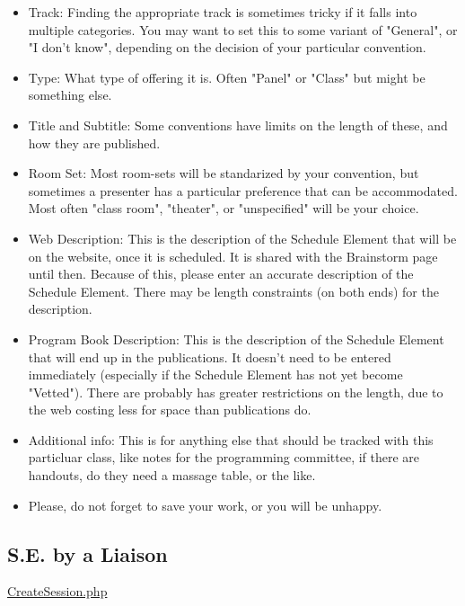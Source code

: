 \documentclass[captions=tablesignature]{scrartcl}
\begin{document}
\begin{itemize}
\item Track: Finding the appropriate track is sometimes tricky if it
falls into multiple categories.  You may want to set this to
some variant of "General", or "I don't know", depending on the
decision of your particular convention.

\item Type: What type of offering it is.  Often "Panel" or "Class" but
might be something else.

\item Title and Subtitle: Some conventions have limits on the length of
these, and how they are published.

\item Room Set: Most room-sets will be standarized by your convention,
but sometimes a presenter has a particular preference that can
be accommodated.  Most often "class room", "theater", or
"unspecified" will be your choice.

\item Web Description: This is the description of the Schedule Element
that will be on the website, once it is scheduled. It is shared
with the Brainstorm page until then. Because of this, please
enter an accurate description of the Schedule Element.  There may
be length constraints (on both ends) for the description.

\item Program Book Description: This is the description of the Schedule
Element that will end up in the publications.  It doesn't need to
be entered immediately (especially if the Schedule Element has
not yet become "Vetted"). There are probably has greater
restrictions on the length, due to the web costing less for space
than publications do.

\item Additional info: This is for anything else that should be tracked
with this particluar class, like notes for the programming
committee, if there are handouts, do they need a massage table,
or the like.

\item Please, do not forget to save your work, or you will be unhappy.
\end{itemize}
\subsection{S.E. by a Liaison}
\label{sec-5-3}
\href{../webpages/CreateSession.php}{CreateSession.php}
\end{document}
